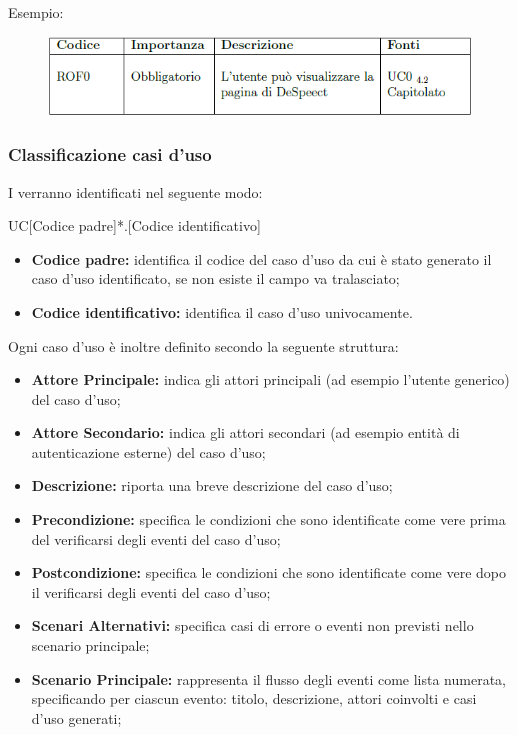 \documentclass[../NomeDocumento.tex]{subfiles}
\begin{document}
	
	Esempio:
	\begin{figure}[h]
		\centering
		\includegraphics[width=0.7\linewidth]{img/esempio_tabella_requisiti}
		\label{fig:esempio di tabella dei requisiti}
	\end{figure}
		
		
	\subsubsection{Classificazione casi d’uso} 
	
I  verranno identificati nel seguente modo: 

\begin{center}
	UC[Codice padre]*.[Codice identificativo]
\end{center}

\begin{itemize}
	\item \textbf{Codice padre:} identifica il codice del caso d'uso da cui è stato generato il caso d'uso identificato, se non esiste il campo va tralasciato;
	\item \textbf{Codice identificativo:} identifica il caso d'uso univocamente.
\end{itemize}

	\noindent Ogni caso d'uso è inoltre definito secondo la seguente struttura:
\begin{itemize}
	\item \textbf{Attore Principale:} indica gli attori principali (ad esempio l'utente generico) del caso d'uso;
	\item \textbf{Attore Secondario:} indica gli attori secondari (ad esempio entità di autenticazione esterne) del caso d'uso;
	\item \textbf{Descrizione:} riporta una breve descrizione del caso d'uso;
	\item \textbf{Precondizione:} specifica le condizioni che sono identificate come vere prima del verificarsi degli eventi del caso d'uso;
	\item \textbf{Postcondizione:} specifica le condizioni che sono identificate come vere dopo il verificarsi degli eventi del caso d'uso;
	
	\item \textbf{Scenari Alternativi:} specifica casi di errore o eventi non previsti nello scenario principale;
	\item \textbf{Scenario Principale:} rappresenta il flusso degli eventi come lista numerata, specificando per ciascun evento: titolo, descrizione, attori coinvolti e casi d'uso generati;
\end{itemize}
\end{document}
